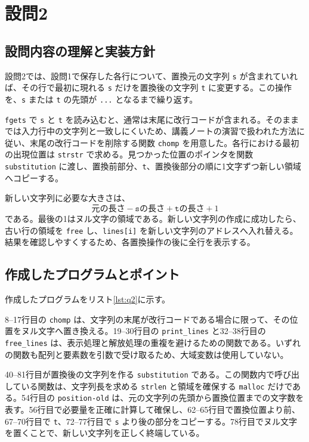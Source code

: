 \documentclass[lualatex,paper=a4paper,fontsize=10pt]{jlreq}
\begin{document}
\section{設問2}
\subsection{設問内容の理解と実装方針}
設問2では、設問1で保存した各行について、置換元の文字列 \texttt{s} が含まれていれば、その行で最初に現れる \texttt{s} だけを置換後の文字列 \texttt{t} に変更する。この操作を、\texttt{s} または \texttt{t} の先頭が \texttt{...} となるまで繰り返す。

\texttt{fgets} で \texttt{s} と \texttt{t} を読み込むと、通常は末尾に改行コードが含まれる。そのままでは入力行中の文字列と一致しにくいため、講義ノートの演習で扱われた方法に従い、末尾の改行コードを削除する関数 \texttt{chomp} を用意した。各行における最初の出現位置は \texttt{strstr} で求める。見つかった位置のポインタを関数 \texttt{substitution} に渡し、置換前部分、\texttt{t}、置換後部分の順に1文字ずつ新しい領域へコピーする。

新しい文字列に必要な大きさは、
\[
  \text{元の長さ}-\texttt{s}\text{の長さ}+\texttt{t}\text{の長さ}+1
\]
である。最後の1はヌル文字の領域である。新しい文字列の作成に成功したら、古い行の領域を \texttt{free} し、\texttt{lines[i]} を新しい文字列のアドレスへ入れ替える。結果を確認しやすくするため、各置換操作の後に全行を表示する。

\subsection{作成したプログラムとポイント}
作成したプログラムをリスト\ref{lst:q2}に示す。



8--17行目の \texttt{chomp} は、文字列の末尾が改行コードである場合に限って、その位置をヌル文字へ置き換える。19--30行目の \texttt{print\_lines} と32--38行目の \texttt{free\_lines} は、表示処理と解放処理の重複を避けるための関数である。いずれの関数も配列と要素数を引数で受け取るため、大域変数は使用していない。

40--81行目が置換後の文字列を作る \texttt{substitution} である。この関数内で呼び出している関数は、文字列長を求める \texttt{strlen} と領域を確保する \texttt{malloc} だけである。54行目の \texttt{position-old} は、元の文字列の先頭から置換位置までの文字数を表す。56行目で必要量を正確に計算して確保し、62--65行目で置換位置より前、67--70行目で \texttt{t}、72--77行目で \texttt{s} より後の部分をコピーする。78行目でヌル文字を置くことで、新しい文字列を正しく終端している。
\end{document}
